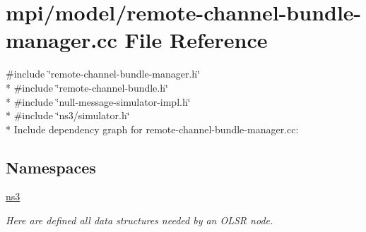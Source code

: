 \hypertarget{remote-channel-bundle-manager_8cc}{}\section{mpi/model/remote-\/channel-\/bundle-\/manager.cc File Reference}
\label{remote-channel-bundle-manager_8cc}
{\ttfamily \#include \char`\"{}remote-\/channel-\/bundle-\/manager.\+h\char`\"{}}\\*
{\ttfamily \#include \char`\"{}remote-\/channel-\/bundle.\+h\char`\"{}}\\*
{\ttfamily \#include \char`\"{}null-\/message-\/simulator-\/impl.\+h\char`\"{}}\\*
{\ttfamily \#include \char`\"{}ns3/simulator.\+h\char`\"{}}\\*
Include dependency graph for remote-\/channel-\/bundle-\/manager.cc\+:
\subsection*{Namespaces}
\begin{DoxyCompactItemize}
\item 
 \hyperlink{namespacens3}{ns3}
\begin{DoxyCompactList}\small\item\em Here are defined all data structures needed by an O\+L\+SR node. \end{DoxyCompactList}\end{DoxyCompactItemize}
